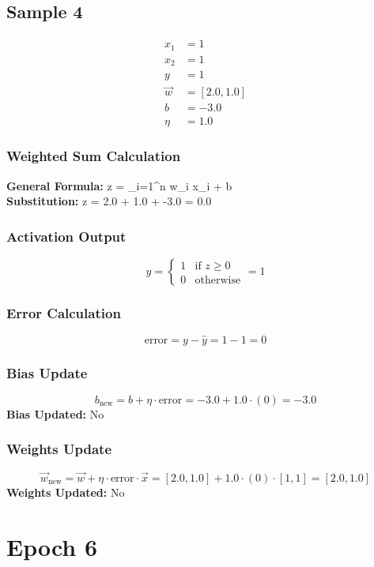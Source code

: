 \documentclass{article}
\begin{document}
\subsection*{Sample 4}
\begin{align*}
x_1 &= 1 \\
x_2 &= 1 \\
y &= 1 \\
\vec{w} &= [2.0, 1.0] \\
b &= -3.0 \\
\eta &= 1.0
\end{align*}

\subsubsection*{Weighted Sum Calculation}
\textbf{General Formula:} \quad
z = \sum_{i=1}^{n} w_i x_i + b
\\
\textbf{Substitution:} \quad
z = 2.0  + 1.0  + -3.0 = 0.0

\subsubsection*{Activation Output}
\[
\hat{y} =
\begin{cases}
1 & \text{if } z \geq 0 \\
0 & \text{otherwise}
\end{cases}
= 1
\]

\subsubsection*{Error Calculation}
\[
\text{error} = y - \hat{y} = 1 - 1 = 0
\]

\subsubsection*{Bias Update}
\[
b_{\text{new}} = b + \eta \cdot \text{error} = -3.0 + 1.0 \cdot (0) = -3.0
\]
\textbf{Bias Updated:} No

\subsubsection*{Weights Update}
\[
\vec{w}_{\text{new}} = \vec{w} + \eta \cdot \text{error} \cdot \vec{x} = 
[2.0, 1.0] + 1.0 \cdot (0) \cdot [1, 1] = 
[2.0, 1.0]
\]
\textbf{Weights Updated:} No

\section*{Epoch 6}
\end{document}

